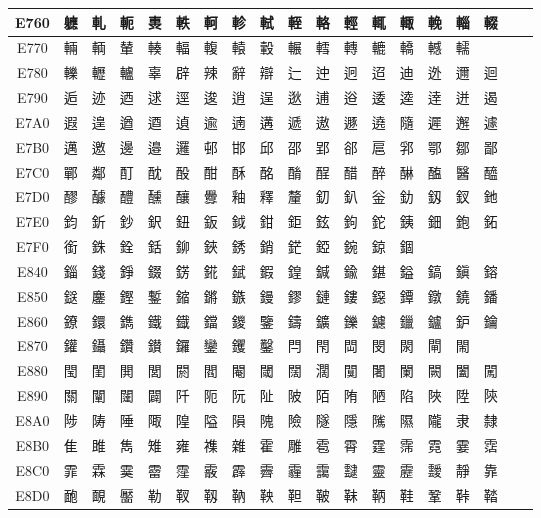 \begin{table}[H]
\begin{tabular}{|Sc|*{16}{>{\centering\arraybackslash}p{1em}|}>{\centering\arraybackslash}p{2.5em}|}
E760 & 軈 & 軋 & 軛 & 軣 & 軼 & 軻 & 軫 & 軾 & 輊 & 輅 & 輕 & 輒 & 輙 & 輓 & 輜 & 輟 \\ \hline
E770 & 輛 & 輌 & 輦 & 輳 & 輻 & 輹 & 轅 & 轂 & 輾 & 轌 & 轉 & 轆 & 轎 & 轗 & 轜 & \\ \hline
E780 & 轢 & 轣 & 轤 & 辜 & 辟 & 辣 & 辭 & 辯 & 辷 & 迚 & 迥 & 迢 & 迪 & 迯 & 邇 & 迴 \\ \hline
E790 & 逅 & 迹 & 迺 & 逑 & 逕 & 逡 & 逍 & 逞 & 逖 & 逋 & 逧 & 逶 & 逵 & 逹 & 迸 & 遏 \\ \hline
E7A0 & 遐 & 遑 & 遒 & 逎 & 遉 & 逾 & 遖 & 遘 & 遞 & 遨 & 遯 & 遶 & 隨 & 遲 & 邂 & 遽 \\ \hline
E7B0 & 邁 & 邀 & 邊 & 邉 & 邏 & 邨 & 邯 & 邱 & 邵 & 郢 & 郤 & 扈 & 郛 & 鄂 & 鄒 & 鄙 \\ \hline
E7C0 & 鄲 & 鄰 & 酊 & 酖 & 酘 & 酣 & 酥 & 酩 & 酳 & 酲 & 醋 & 醉 & 醂 & 醢 & 醫 & 醯 \\ \hline
E7D0 & 醪 & 醵 & 醴 & 醺 & 釀 & 釁 & 釉 & 釋 & 釐 & 釖 & 釟 & 釡 & 釛 & 釼 & 釵 & 釶 \\ \hline
E7E0 & 鈞 & 釿 & 鈔 & 鈬 & 鈕 & 鈑 & 鉞 & 鉗 & 鉅 & 鉉 & 鉤 & 鉈 & 銕 & 鈿 & 鉋 & 鉐 \\ \hline
E7F0 & 銜 & 銖 & 銓 & 銛 & 鉚 & 鋏 & 銹 & 銷 & 鋩 & 錏 & 鋺 & 鍄 & 錮 & & & \\ \hline
E840 & 錙 & 錢 & 錚 & 錣 & 錺 & 錵 & 錻 & 鍜 & 鍠 & 鍼 & 鍮 & 鍖 & 鎰 & 鎬 & 鎭 & 鎔 \\ \hline
E850 & 鎹 & 鏖 & 鏗 & 鏨 & 鏥 & 鏘 & 鏃 & 鏝 & 鏐 & 鏈 & 鏤 & 鐚 & 鐔 & 鐓 & 鐃 & 鐇 \\ \hline
E860 & 鐐 & 鐶 & 鐫 & 鐵 & 鐡 & 鐺 & 鑁 & 鑒 & 鑄 & 鑛 & 鑠 & 鑢 & 鑞 & 鑪 & 鈩 & 鑰 \\ \hline
E870 & 鑵 & 鑷 & 鑽 & 鑚 & 鑼 & 鑾 & 钁 & 鑿 & 閂 & 閇 & 閊 & 閔 & 閖 & 閘 & 閙 & \\ \hline
E880 & 閠 & 閨 & 閧 & 閭 & 閼 & 閻 & 閹 & 閾 & 闊 & 濶 & 闃 & 闍 & 闌 & 闕 & 闔 & 闖 \\ \hline
E890 & 關 & 闡 & 闥 & 闢 & 阡 & 阨 & 阮 & 阯 & 陂 & 陌 & 陏 & 陋 & 陷 & 陜 & 陞 & 陝 \\ \hline
E8A0 & 陟 & 陦 & 陲 & 陬 & 隍 & 隘 & 隕 & 隗 & 險 & 隧 & 隱 & 隲 & 隰 & 隴 & 隶 & 隸 \\ \hline
E8B0 & 隹 & 雎 & 雋 & 雉 & 雍 & 襍 & 雜 & 霍 & 雕 & 雹 & 霄 & 霆 & 霈 & 霓 & 霎 & 霑 \\ \hline
E8C0 & 霏 & 霖 & 霙 & 霤 & 霪 & 霰 & 霹 & 霽 & 霾 & 靄 & 靆 & 靈 & 靂 & 靉 & 靜 & 靠 \\ \hline
E8D0 & 靤 & 靦 & 靨 & 勒 & 靫 & 靱 & 靹 & 鞅 & 靼 & 鞁 & 靺 & 鞆 & 鞋 & 鞏 & 鞐 & 鞜 \\ \hline

\end{tabular}
\end{table}

